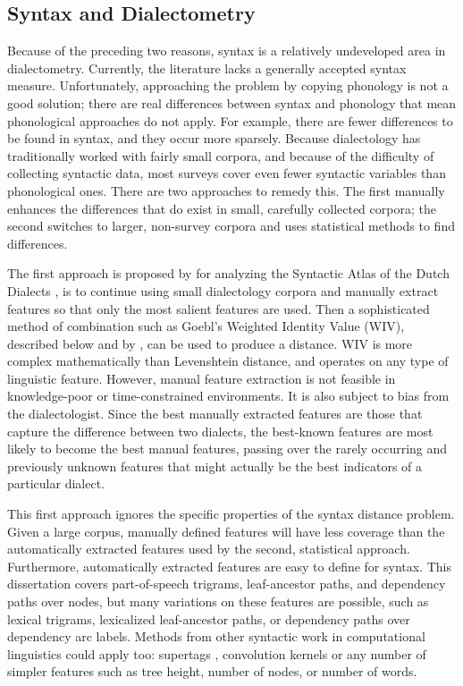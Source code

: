 \subsection{Syntax and Dialectometry}

Because of the preceding two reasons, syntax is a relatively
undeveloped area in dialectometry. Currently, the literature lacks a
generally accepted syntax measure. Unfortunately, approaching the
problem by copying phonology is not a good solution; there are real
differences between syntax and phonology that mean phonological
approaches do not apply. For example, there are fewer differences to
be found in syntax, and they occur more sparsely.  Because
dialectology has traditionally worked with fairly small corpora, and
because of the difficulty of collecting syntactic data, most surveys
cover even fewer syntactic variables than phonological ones. There are
two approaches to remedy this. The first manually enhances the
differences that do exist in small, carefully collected corpora; the
second switches to larger, non-survey corpora and uses statistical
methods to find differences.

The first approach is proposed by  for analyzing
the Syntactic Atlas of the Dutch Dialects \cite{barbiers05}, is to
continue using small dialectology corpora and manually extract
features so that only the most salient features are used. Then a
sophisticated method of combination such as Goebl's Weighted Identity
Value (WIV), described below and by , can be used to
produce a distance. WIV is more complex mathematically than
Levenshtein distance, and operates on any type of linguistic
feature. However, manual feature extraction is not feasible in
knowledge-poor or time-constrained environments. It is also subject to
bias from the dialectologist. Since the best manually extracted
features are those that capture the difference between two dialects,
the best-known features are most likely to become the best manual
features, passing over the rarely occurring and previously unknown
features that might actually be the best indicators of a particular
dialect.

This first approach ignores the specific properties of the syntax
distance problem. Given a large corpus, manually defined features will
have less coverage than the automatically extracted features used by
the second, statistical approach. Furthermore, automatically extracted
features are easy to define for syntax.  This dissertation covers
part-of-speech trigrams, leaf-ancestor paths, and dependency paths
over nodes, but many variations on these features are possible, such
as lexical trigrams, lexicalized leaf-ancestor paths, or dependency
paths over dependency arc labels. Methods from other syntactic work in
computational linguistics could apply too: supertags \cite{joshi94},
convolution kernels \cite{collins01} or any number of simpler features
such as tree height, number of nodes, or number of words.

